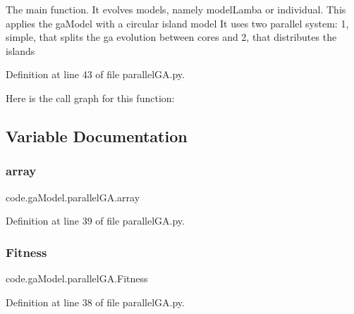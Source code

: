 \begin{DoxyVerb}The main function. It evolves models, namely modelLamba or individual. 
This applies the gaModel with a circular island model
It uses two parallel system: 1, simple, that splits the ga evolution between cores
and 2, that distributes the islands
\end{DoxyVerb}
 

Definition at line 43 of file parallel\+G\+A.\+py.

Here is the call graph for this function\+:


\subsection{Variable Documentation}
\mbox{\label{namespacecode_1_1ga_model_1_1parallel_g_a_a39d5b5a2692ac279d7dd14176f89b2b1}} 
\subsubsection{\texorpdfstring{array}{array}}
{\footnotesize\ttfamily code.\+ga\+Model.\+parallel\+G\+A.\+array}



Definition at line 39 of file parallel\+G\+A.\+py.

\mbox{\label{namespacecode_1_1ga_model_1_1parallel_g_a_a7755e12a4252f1d98a695e94f5bd9488}} 
\subsubsection{\texorpdfstring{Fitness}{Fitness}}
{\footnotesize\ttfamily code.\+ga\+Model.\+parallel\+G\+A.\+Fitness}



Definition at line 38 of file parallel\+G\+A.\+py.

\mbox{\label{namespacecode_1_1ga_model_1_1parallel_g_a_af7c1add0868b0cc53a3bf25bb8f60bd1}} 
